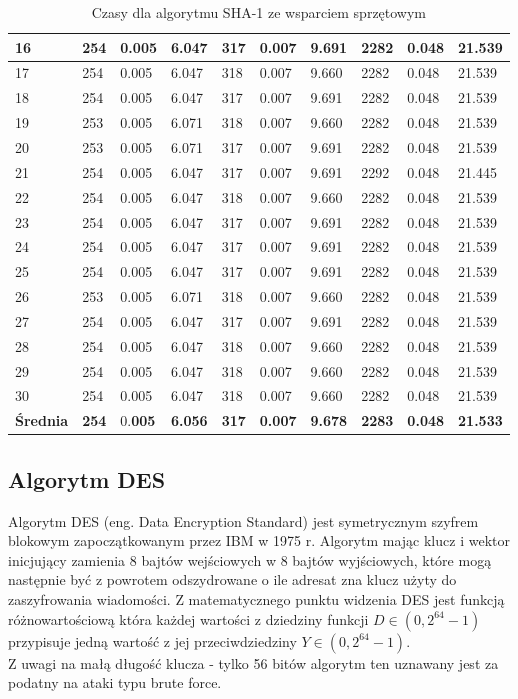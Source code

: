 \documentclass[oneside]{mgr}
\begin{document}
\begin{table}
\begin{tabularx}{\linewidth}{|X|X|X|X|X|X|X|X|X|X|}
16 &	254	& 0.005	& 6.047	& 317	& 0.007 &	9.691 &	2282 &	0.048 &	21.539 \\ \hline
17 &	254	& 0.005	& 6.047	& 318	& 0.007 &	9.660 &	2282 &	0.048 &	21.539 \\ \hline
18 &	254	& 0.005	& 6.047	& 317	& 0.007 &	9.691 &	2282 &	0.048 &	21.539 \\ \hline
19 &	253	& 0.005	& 6.071	& 318	& 0.007 &	9.660 &	2282 &	0.048 &	21.539 \\ \hline
20 &	253	& 0.005	& 6.071	& 317	& 0.007 &	9.691 &	2282 &	0.048 &	21.539 \\ \hline
21 &	254	& 0.005	& 6.047	& 317	& 0.007 &	9.691 &	2292 &	0.048 &	21.445 \\ \hline
22 &	254	& 0.005	& 6.047	& 318	& 0.007 &	9.660 &	2282 &	0.048 &	21.539 \\ \hline
23 &	254	& 0.005	& 6.047	& 317	& 0.007 &	9.691 &	2282 &	0.048 &	21.539 \\ \hline
24 &	254	& 0.005	& 6.047	& 317	& 0.007 &	9.691 &	2282 &	0.048 &	21.539 \\ \hline
25 &	254	& 0.005	& 6.047	& 317	& 0.007 &	9.691 &	2282 &	0.048 &	21.539 \\ \hline
26 &	253	& 0.005	& 6.071	& 318	& 0.007 &	9.660 &	2282 &	0.048 &	21.539 \\ \hline
27 &	254	& 0.005	& 6.047	& 317	& 0.007 &	9.691 &	2282 &	0.048 &	21.539 \\ \hline
28 &	254	& 0.005	& 6.047	& 318	& 0.007 &	9.660 &	2282 &	0.048 &	21.539 \\ \hline
29 &	254	& 0.005	& 6.047	& 318	& 0.007 &	9.660 &	2282 &	0.048 &	21.539 \\ \hline
30 &	254	& 0.005	& 6.047	& 318	& 0.007 &	9.660 &	2282 &	0.048 &	21.539 \\ \hline
\textbf{Średnia} &	\textbf{254} &	0.\textbf{005} &	\textbf{6.056} &	\textbf{317}	& \textbf{0.007}	& \textbf{9.678}	& \textbf{2283}	& \textbf{0.048}	& \textbf{21.533} \\ \hline


    \end{tabularx}
    \caption{Czasy dla algorytmu SHA-1 ze wsparciem sprzętowym}
\end{table}\pagebreak 

\subsection{Algorytm DES}
Algorytm DES (eng. Data Encryption Standard) jest symetrycznym szyfrem blokowym zapoczątkowanym przez IBM w 1975 r. Algorytm mając klucz i wektor inicjujący zamienia 8 bajtów wejściowych w 8 bajtów wyjściowych, które mogą następnie być z powrotem odszydrowane o ile adresat zna klucz użyty do zaszyfrowania wiadomości. Z matematycznego punktu widzenia DES jest funkcją różnowartościową która każdej wartości z dziedziny funkcji $D \in \left( 0, 2^{64}-1 \right)$ przypisuje jedną wartość z jej przeciwdziedziny $Y \in \left( 0, 2^{64}-1 \right)$.\\
Z uwagi na małą długość klucza - tylko 56 bitów algorytm ten uznawany jest za podatny na ataki typu brute force.
\end{document}
